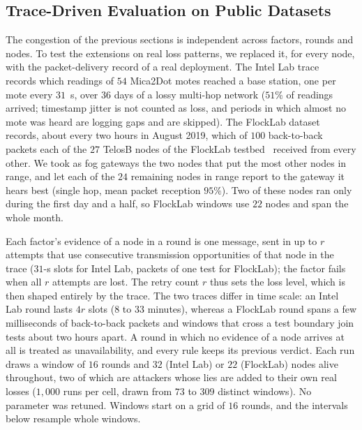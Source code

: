 \documentclass{ieeeaccess}
\begin{document}
\subsection{Trace-Driven Evaluation on Public Datasets}
\label{sec:res-trace}
The congestion of the previous sections is independent across factors,
rounds and nodes.  To test the extensions on real loss patterns, we
replaced it, for every node, with the packet-delivery record of a real
deployment.  The Intel Lab trace~\cite{bodik2004intel} records which
readings of $54$ Mica2Dot motes reached a base station, one per mote
every $31$~s, over $36$ days of a lossy multi-hop network ($51\%$ of
readings arrived; timestamp jitter is not counted as loss, and periods
in which almost no mote was heard are logging gaps and are skipped).
The FlockLab dataset~\cite{jacob2019flocklab} records, about every two
hours in August 2019, which of $100$ back-to-back packets each of the
$27$ TelosB nodes of the FlockLab testbed~\cite{lim2013flocklab}
received from every other.  We took as fog gateways the two nodes that
put the most other nodes in range, and let each of the $24$ remaining
nodes in range report to the gateway it hears best (single hop, mean
packet reception $95\%$).  Two of these nodes ran only during the first
day and a half, so FlockLab windows use $22$ nodes and span the whole
month.

Each factor's evidence of a node in a round is one message, sent in up
to $r$ attempts that use consecutive transmission opportunities of
that node in the trace ($31$-s slots for Intel Lab, packets of one
test for FlockLab); the factor fails when all $r$ attempts are lost.
The retry count $r$ thus sets the loss level, which is then shaped
entirely by the trace.  The two traces differ in time scale: an Intel
Lab round lasts $4r$ slots ($8$ to $33$ minutes), whereas a FlockLab
round spans a few milliseconds of back-to-back packets and windows that
cross a test boundary join tests about two hours apart.  A round in
which no evidence of a node arrives at all is treated as
unavailability, and every rule keeps its previous verdict.  Each run
draws a window of $16$ rounds and $32$ (Intel Lab) or $22$ (FlockLab)
nodes alive throughout, two of which are attackers whose lies are added
to their own real losses ($1{,}000$ runs per cell, drawn from $73$ to
$309$ distinct windows).  No parameter was retuned.  Windows start on a
grid of $16$ rounds, and the intervals below resample whole windows.
\end{document}
